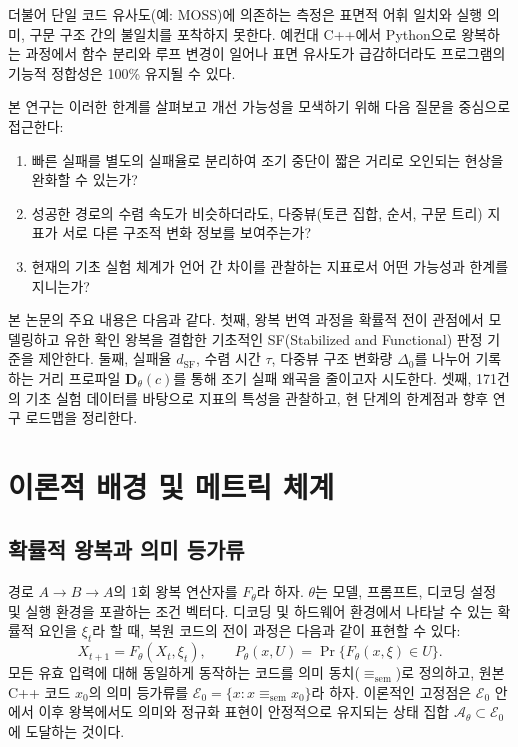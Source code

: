 \documentclass[a4paper,10pt,twocolumn,twoside]{article}
\newcommand{\dsf}{d_{\mathrm{SF}}}
\begin{document}
더불어 단일 코드 유사도(예: MOSS)에 의존하는 측정은 표면적 어휘 일치와 실행 의미, 구문 구조 간의 불일치를 포착하지 못한다\cite{tsed,codebleu}. 예컨대 C++에서 Python으로 왕복하는 과정에서 함수 분리와 루프 변경이 일어나 표면 유사도가 급감하더라도 프로그램의 기능적 정합성은 100\% 유지될 수 있다.

본 연구는 이러한 한계를 살펴보고 개선 가능성을 모색하기 위해 다음 질문을 중심으로 접근한다:
\begin{enumerate}
\item 빠른 실패를 별도의 실패율로 분리하여 조기 중단이 짧은 거리로 오인되는 현상을 완화할 수 있는가?
\item 성공한 경로의 수렴 속도가 비슷하더라도, 다중뷰(토큰 집합, 순서, 구문 트리) 지표가 서로 다른 구조적 변화 정보를 보여주는가?
\item 현재의 기초 실험 체계가 언어 간 차이를 관찰하는 지표로서 어떤 가능성과 한계를 지니는가?
\end{enumerate}

본 논문의 주요 내용은 다음과 같다. 첫째, 왕복 번역 과정을 확률적 전이 관점에서 모델링하고 유한 확인 왕복을 결합한 기초적인 SF(Stabilized and Functional) 판정 기준을 제안한다. 둘째, 실패율 $\dsf$, 수렴 시간 $\tau$, 다중뷰 구조 변화량 $\Delta_0$를 나누어 기록하는 거리 프로파일 $\mathbf{D}_\theta(c)$를 통해 조기 실패 왜곡을 줄이고자 시도한다. 셋째, 171건의 기초 실험 데이터를 바탕으로 지표의 특성을 관찰하고, 현 단계의 한계점과 향후 연구 로드맵을 정리한다.

\section{이론적 배경 및 메트릭 체계}

\subsection{확률적 왕복과 의미 등가류}

경로 $A \to B \to A$의 1회 왕복 연산자를 $F_\theta$라 하자. $\theta$는 모델, 프롬프트, 디코딩 설정 및 실행 환경을 포괄하는 조건 벡터다. 디코딩 및 하드웨어 환경에서 나타날 수 있는 확률적 요인을 $\xi_t$라 할 때, 복원 코드의 전이 과정은 다음과 같이 표현할 수 있다:
\begin{equation}
X_{t+1} = F_\theta(X_t, \xi_t), \qquad P_\theta(x, U) = \Pr\{F_\theta(x, \xi) \in U\}.
\end{equation}
모든 유효 입력에 대해 동일하게 동작하는 코드를 의미 동치($\equiv_{\mathrm{sem}}$)로 정의하고, 원본 C++ 코드 $x_0$의 의미 등가류를 $\mathcal{E}_0 = \{x : x \equiv_{\mathrm{sem}} x_0\}$라 하자. 이론적인 고정점은 $\mathcal{E}_0$ 안에서 이후 왕복에서도 의미와 정규화 표현이 안정적으로 유지되는 상태 집합 $\mathcal{A}_\theta \subset \mathcal{E}_0$에 도달하는 것이다.
\end{document}
